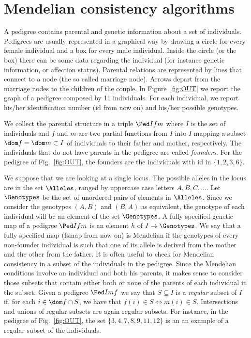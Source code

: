 \section{Mendelian consistency algorithms}
\label{sec:problem}

A pedigree contains parental and genetic information about a set of individuals.
Pedigrees are usually represented in a graphical way by drawing a circle for
every female individual and a box for every male individual. Inside the circle
(or the box) there can be some data regarding the individual (for instance
genetic information, or affection status). Parental relations are represented by
lines that connect to a node (the so called marriage node). Arrows depart from
the marriage nodes to the children of the couple. In Figure~\ref{fig:OUT} we
report the graph of a pedigree composed by 11 individuals. For each individual,
we report his/her identification number (id from now on) and his/her possible
genotypes.

We collect the
parental structure in a triple $\Ped I f m$ where $I$ is the set of individuals
and $f$ and $m$ are two partial functions from $I$ into $I$ mapping a subset
$\dom f = \dom m \subset I$ of individuals to their father and mother,
respectively.  The individuals that do not have parents in the pedigree are
called \emph{founders}. For the pedigree of Fig.~\ref{fig:OUT}, the founders are
the individuals with id in $\{1,2,3,6\}$.


We suppose that we are looking at a single locus. The possible alleles in the
locus are in the set $\Alleles$, ranged by uppercase case letters $A, B, C,
\ldots$. Let $\Genotypes$ be the set of unordered pairs of elements in
$\Alleles$. Since we consider the genotypes $(A,B)$ and $(B,A)$ as equivalent,
the genotype of each individual will be an element of the set $\Genotypes$. A
fully specified genetic map of a pedigree $\Ped I f m$ is an element $h$ of
$I\to \Genotypes$.  We say that a fully specified map (fsmap from now on) is
Mendelian if the genotypes of every non-founder individual is such that one of
its allele is derived from the mother and the other from the father.  It is
often useful to check for Mendelian consistency in a subset of the individuals
in the pedigree. Since the Mendelian conditions involve an individual and both
his parents, it makes sense to consider those subsets that contain either both
or none of the parents of each individual in the subset. Given a pedigree $\Ped
I m f$ we say that $S\subseteq I$ is a {\em regular} subset of $I$ if, for each
$i\in \dom f \cap S$, we have that $f(i) \in S \iff m(i) \in S$. Intersections
and unions of regular subsets are again regular subsets. For instance, in the
pedigree of Fig.~\ref{fig:OUT}, the set $\{3,4,7,8,9,11,12\}$ is an an example
of a regular subset of the individuals.

